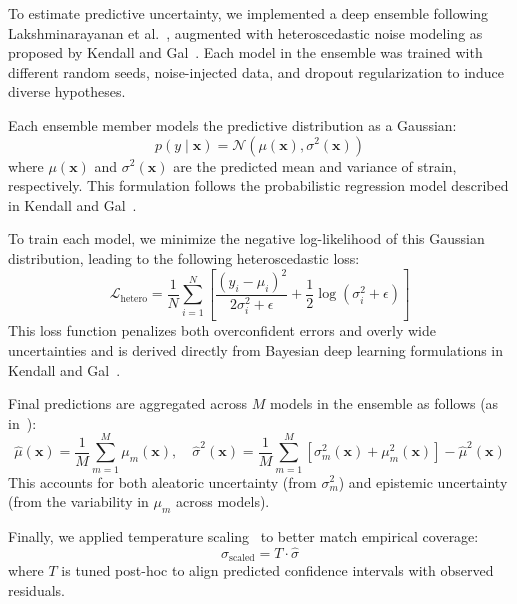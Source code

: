 \documentclass{article}
\begin{document}
To estimate predictive uncertainty, we implemented a deep ensemble following Lakshminarayanan et al.~\cite{lakshminarayanan2017simple}, augmented with heteroscedastic noise modeling as proposed by Kendall and Gal~\cite{kendall2017uncertainties}. Each model in the ensemble was trained with different random seeds, noise-injected data, and dropout regularization to induce diverse hypotheses.

Each ensemble member models the predictive distribution as a Gaussian:
\begin{equation}
p(y \mid \mathbf{x}) = \mathcal{N}(\mu(\mathbf{x}), \sigma^2(\mathbf{x}))
\end{equation}
where $\mu(\mathbf{x})$ and $\sigma^2(\mathbf{x})$ are the predicted mean and variance of strain, respectively. This formulation follows the probabilistic regression model described in Kendall and Gal~\cite{kendall2017uncertainties}.

To train each model, we minimize the negative log-likelihood of this Gaussian distribution, leading to the following heteroscedastic loss:
\begin{equation}
\mathcal{L}_{\text{hetero}} = \frac{1}{N} \sum_{i=1}^{N} \left[
\frac{(y_i - \mu_i)^2}{2\sigma_i^2 + \epsilon} + \frac{1}{2} \log(\sigma_i^2 + \epsilon)
\right]
\label{eq:heteroscedastic_loss}
\end{equation}
This loss function penalizes both overconfident errors and overly wide uncertainties and is derived directly from Bayesian deep learning formulations in Kendall and Gal~\cite{kendall2017uncertainties}.

Final predictions are aggregated across $M$ models in the ensemble as follows (as in~\cite{lakshminarayanan2017simple}):
\begin{equation}
\hat{\mu}(\mathbf{x}) = \frac{1}{M} \sum_{m=1}^{M} \mu_m(\mathbf{x}), \quad
\hat{\sigma}^2(\mathbf{x}) = \frac{1}{M} \sum_{m=1}^{M} \left[
\sigma_m^2(\mathbf{x}) + \mu_m^2(\mathbf{x})
\right] - \hat{\mu}^2(\mathbf{x})
\end{equation}
This accounts for both aleatoric uncertainty (from $\sigma_m^2$) and epistemic uncertainty (from the variability in $\mu_m$ across models).

Finally, we applied temperature scaling~\cite{guo2017calibration} to better match empirical coverage:
\begin{equation}
\sigma_{\text{scaled}} = T \cdot \hat{\sigma}
\end{equation}
where $T$ is tuned post-hoc to align predicted confidence intervals with observed residuals.
\end{document}
